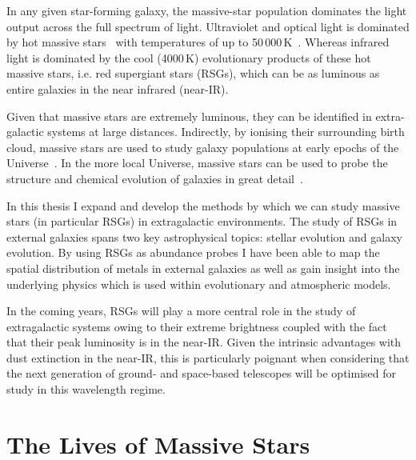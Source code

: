 In any given star-forming galaxy, the massive-star population dominates the light output across the full spectrum of light.
Ultraviolet and optical light is dominated by hot massive stars~\citep{1998ARA&A..36..189K,2012ARA&A..50..531K} with temperatures of up to 50\,000\,K~\citep[e.g.][]{2011A&A...530L..14B}.
Whereas infrared light is dominated by the cool (4000\,K) evolutionary products of these hot massive stars, i.e. red supergiant stars (RSGs), which can be as luminous as entire galaxies in the near infrared (near-IR).

Given that massive stars are extremely luminous, they can be identified in extra-galactic systems at large distances.
Indirectly, by ionising their surrounding birth cloud, massive stars are used to study galaxy populations at early epochs of the Universe~\citep{2004MNRAS.348L..59P}.
In the more local Universe, massive stars can be used to probe the structure and chemical evolution of galaxies in great detail~\citep{2007ApJ...659.1198E,2008ApJ...681..269K,2008MNRAS.386..826E,2010AN....331..459K,2011A&A...530A.108E,2012A&A...542A..79C}.

In this thesis I expand and develop the methods by which we can study massive stars (in particular RSGs) in extragalactic environments.
The study of RSGs in external galaxies spans two key astrophysical topics: stellar evolution and galaxy evolution.
By using RSGs as abundance probes I have been able to map the spatial distribution of metals in external galaxies as well as gain insight into the underlying physics which is used within evolutionary and atmospheric models.

In the coming years, RSGs will play a more central role in the study of extragalactic systems owing to their extreme brightness coupled with the fact that their peak luminosity is in the near-IR. Given the intrinsic advantages with dust extinction in the near-IR, this is particularly poignant when considering that the next generation of ground- and space-based telescopes will be optimised for study in this wavelength regime.


\section{The Lives of Massive Stars} %
\label{sec:lives}

